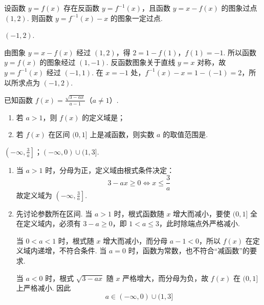 \begin{problem}
设函数 \( y = f(x) \) 存在反函数 \( y = f^{-1}(x) \)，且函数 \( y = x - f(x) \) 的图象过点 \((1,2)\). 则函数 \( y = f^{-1}(x) - x \) 的图象一定过点\fillinblank{}.
\end{problem}

\begin{answer}
\((-1,2)\).
\end{answer}

\begin{solution}
由图象 \(y=x-f(x)\) 经过 \((1,2)\)，得
\(2=1-f(1)\)，\(f(1)=-1\).
所以函数 \(y=f(x)\) 的图象经过 \((1,-1)\). 反函数图象关于直线 \(y=x\) 对称，故 \(y=f^{-1}(x)\) 经过 \((-1,1)\). 在 \(x=-1\) 处，\(f^{-1}(x)-x=1-(-1)=2\)，所以所求点为 \((-1,2)\).
\end{solution}

\begin{problem}
已知函数 \(f(x) = \frac{\sqrt{3 - ax}}{a - 1}\)（\(a \neq 1\)）.
\begin{enumerate}
\item 若 \(a > 1\)，则 \(f(x)\) 的定义域是\fillinblank{}；
\item 若 \( f(x) \) 在区间 \( (0,1] \) 上是减函数，则实数 \(a\) 的取值范围是\fillinblank{}.
\end{enumerate}
\end{problem}

\begin{answer}
\(\left(-\infty,\frac{3}{a}\right]\)；\((-\infty,0)\cup(1,3]\).
\end{answer}

\begin{solution}
\begin{enumerate}
\item 当 \(a>1\) 时，分母为正，定义域由根式条件决定：
\[
3-ax\geqslant0\Longleftrightarrow x\leqslant\frac3a
\]
故定义域为 \(\left(-\infty,\frac3a\right]\).
\item 先讨论参数所在区间. 当 \(a>1\) 时，根式函数随 \(x\) 增大而减小，要使 \((0,1]\) 全在定义域内，必须有 \(3-a\geqslant0\)，即 \(1<a\leqslant3\)，此时除端点外严格减小.

当 \(0<a<1\) 时，根式随 \(x\) 增大而减小，而分母 \(a-1<0\)，所以 \(f(x)\) 在定义域内递增，不符合条件. 当 \(a=0\) 时，函数为常数，也不符合“减函数”的要求.

当 \(a<0\) 时，根式 \(\sqrt{3-ax}\) 随 \(x\) 严格增大，而分母为负，故 \(f(x)\) 在 \((0,1]\) 上严格减小. 因此
\[
a\in(-\infty,0)\cup(1,3]
\]
\end{enumerate}
\end{solution}

